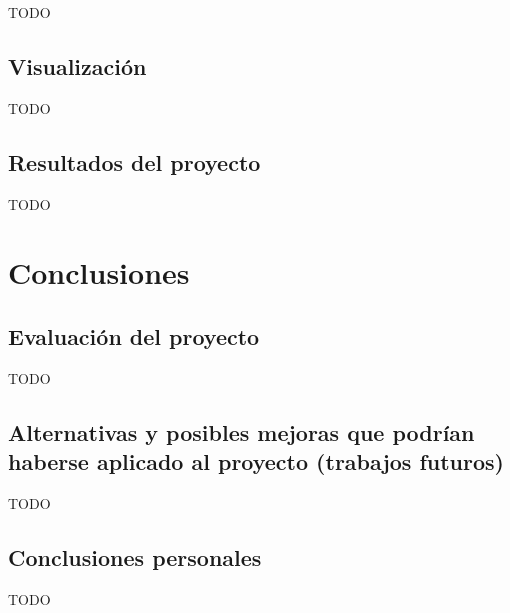 \documentclass[]{article}
\begin{document}
TODO

\subsection{Visualización}

TODO

\subsection{Resultados del proyecto}

TODO


\section{Conclusiones}

\subsection{Evaluación del proyecto}

TODO

\subsection{Alternativas y posibles mejoras que podrían haberse aplicado al proyecto (trabajos futuros)}

TODO

\subsection{Conclusiones personales}

TODO
\end{document}

